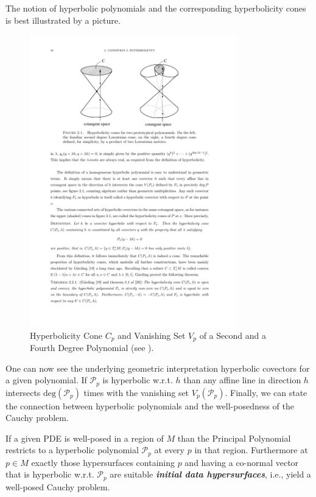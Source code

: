 The notion of hyperbolic polynomials and the corresponding hyperbolicity cones is best illustrated by a picture. 
\begin{figure}[hbt!]
    \centering
    \includegraphics[width=0.8\textwidth]{Poly.pdf}
    \caption{Hyperbolicity Cone $C_p$ and Vanishing Set $V_p$ of a Second and a Fourth Degree Polynomial (see \cite{Rivera}).}
    \label{hyperbol}
\end{figure}
One can now see the underlying geometric interpretation hyperbolic covectors for a given polynomial. If $\mathcal{P}_p$ is hyperbolic w.r.t. $h$ than any affine line in direction $h$ intersects $\mathrm{deg}(\mathcal{P}_p)$ times with the vanishing set $V_p(\mathcal{P}_p)$.
Finally, we can state the connection between hyperbolic polynomials and the well-posedness of the Cauchy problem.
\begin{theorem}
If a given PDE is well-posed in a region of $M$ than the Principal Polynomial restricts to a hyperbolic polynomial $\mathcal{P}_p$ at every $p$ in that region. Furthermore at $p \in M$ exactly those hypersurfaces containing $p$ and having a co-normal vector that is hyperbolic w.r.t. $\mathcal{P}_p$ are suitable \textit{\textbf{initial data hypersurfaces}}, i.e., yield a well-posed Cauchy problem.
\end{theorem}

